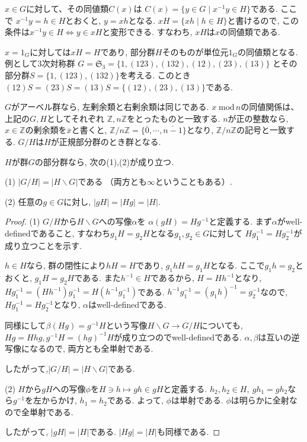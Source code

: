 $x \in G$に対して、その同値類$C(x)$は
$C(x)=\{ y \in G \mid x^{-1}y \in H\}$である.
ここで $x^{-1}y=h\in H$とおくと, $y=xh$となる.
$xH = \{xh \mid h \in H\} $と書けるので,
この条件は$x^{-1}y \in H \Leftrightarrow y \in xH$と変形できる.
すなわち, $xH$は$x$の同値類である.

$x=1_G$に対しては$xH=H$であり, 部分群$H$そのものが単位元$1_G$の同値類となる.
例として3次対称群
$G=\mathfrak{S}_3=\{ 1, (1 2 3), (1 3 2), (1 2), (2 3), (1 3) \}$
とその部分群$S=\{1, (1 2 3), (1 3 2) \}$を考える.
このとき$(1 2)S = (2 3)S = (1 3)S=\{(1 2), (2 3), (1 3) \}$である.
\newline

$G$がアーベル群なら, 左剰余類と右剰余類は同じである.
$x \; \mathrm{mod}\, n$の同値関係は、上記の$G,H$としてそれぞれ
$\mathbb{Z}, n\mathbb{Z}$をとったものと一致する.
$n$が正の整数なら, $x \in \mathbb{Z}$の剰余類を$\overline{x}$と書くと,
$\mathbb{Z}/n\mathbb{Z}=\{\overline{0},\cdots, \overline{n-1}\}$となり,
$\mathbb{Z}/n\mathbb{Z}$の記号と一致する.
$G/H$は$H$が正規部分群のとき群となる.\newline

\begin{tcolorbox}
	\begin{prp*}
		$H$が群$G$の部分群なら, 次の(1),(2)が成り立つ.

		(1) $\left| G/H \right| = \left| H\backslash G \right|$である
		（両方とも$\infty$ということもある）.

		(2) 任意の$g \in G$に対し,
		$ \left| gH \right| = \left| Hg \right| =|H|$.
	\end{prp*}
\end{tcolorbox}
\begin{proof}
	(1) $G/H$から$H\backslash G$への写像$\alpha$を
	$ \alpha(gH)=Hg^{-1}$と定義する.
	まず$\alpha$がwell-definedであること, 
	すなわち$g_1H=g_2H$となる$g_1,g_2 \in G$に対して
	$Hg_1^{-1}=Hg_2^{-1}$が成り立つことを示す.
	
	$ h \in H$なら, 群の閉性により$hH=H$であり, $g_1hH=g_1H$となる.
	ここで$g_1h=g_2$とおくと, $g_1H=g_2H$である.
	また$h^{-1} \in H$であるから, $H=Hh^{-1}$となり,
	$Hg_1^{-1}=(Hh^{-1})g_1^{-1}=H(h^{-1}g_1^{-1})$である.
	$h^{-1}g_1^{-1}=(g_1h)^{-1}=g_2^{-1}$なので,
	$ Hg_1^{-1}=Hg_2^{-1}$となり, $\alpha$はwell-definedである.

	同様にして$\beta(Hg)=g^{-1}H$という写像$H\backslash G \to G/H$についても,
	$Hg=Hhg,g^{-1}H=(hg)^{-1}H $が成り立つのでwell-definedである.
	$ \alpha, \beta$は互いの逆写像になるので, 両方とも全単射である.

	したがって,$ \left| G/H \right|=\left| H \backslash G \right| $である.

	(2) $H$から$gH$への写像$\phi$を$H \ni h \mapsto gh \in gH $と定義する.
	$h_2,h_2 \in H,\: gh_1=gh_2$なら$g^{-1}$を左からかけ, $h_1=h_2$である.
	よって, $\phi$は単射である. $\phi$は明らかに全射なので全単射である. 
	
	したがって, $ \left| gH \right| = \left| H \right|$である.
	$ \left| Hg \right| = \left| H \right|$も同様である.
\end{proof}

